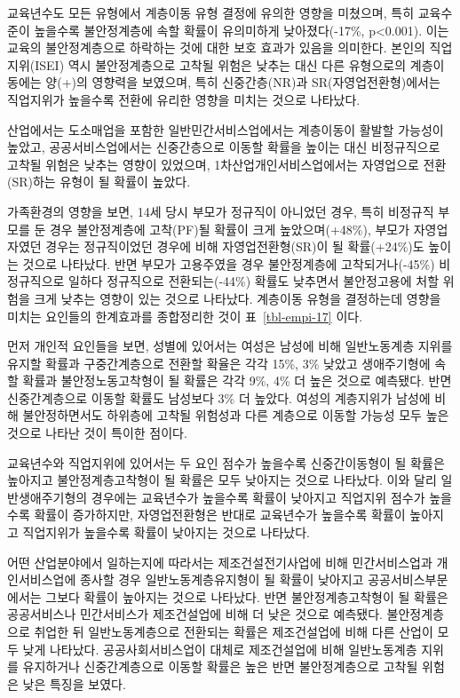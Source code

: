 \documentclass[
  letterpaper,
  DIV=11,
  numbers=noendperiod]{scrartcl}
\begin{document}
교육년수도 모든 유형에서 계층이동 유형 결정에 유의한 영향을 미쳤으며,
특히 교육수준이 높을수록 불안정계층에 속할 확률이 유의미하게
낮아졌다(-17\%, p\textless0.001). 이는 교육의 불안정계층으로 하락하는
것에 대한 보호 효과가 있음을 의미한다. 본인의 직업지위(ISEI) 역시
불안정계층으로 고착될 위험은 낮추는 대신 다른 유형으로의 계층이동에는
양(+)의 영향력을 보였으며, 특히 신중간층(NR)과 SR(자영업전환형)에서는
직업지위가 높을수록 전환에 유리한 영향을 미치는 것으로 나타났다.

산업에서는 도소매업을 포함한 일반민간서비스업에서는 계층이동이 활발할
가능성이 높았고, 공공서비스업에서는 신중간층으로 이동할 확률을 높이는
대신 비정규직으로 고착될 위험은 낮추는 영향이 있었으며,
1차산업개인서비스업에서는 자영업으로 전환(SR)하는 유형이 될 확률이
높았다.

가족환경의 영향을 보면, 14세 당시 부모가 정규직이 아니었던 경우, 특히
비정규직 부모를 둔 경우 불안정계층에 고착(PF)될 확률이 크게
높았으며(+48\%), 부모가 자영업자였던 경우는 정규직이었던 경우에 비해
자영업전환형(SR)이 될 확률(+24\%)도 높이는 것으로 나타났다. 반면 부모가
고용주였을 경우 불안정계층에 고착되거나(-45\%) 비정규직으로 일하다
정규직으로 전환되는(-44\%) 확률도 낮추면서 불안정고용에 처할 위험을 크게
낮추는 영향이 있는 것으로 나타났다. 계층이동 유형을 결정하는데 영향을
미치는 요인들의 한계효과를 종합정리한 것이 표~\ref{tbl-empi-17} 이다.

먼저 개인적 요인들을 보면, 성별에 있어서는 여성은 남성에 비해
일반노동계층 지위를 유지할 확률과 구중간계층으로 전환할 확율은 각각
15\%, 3\% 낮았고 생애주기형에 속할 확률과 불안정노동고착형이 될 확률은
각각 9\%, 4\% 더 높은 것으로 예측됐다. 반면 신중간계층으로 이동할 확률도
남성보다 3\% 더 높았다. 여성의 계층지위가 남성에 비해 불안정하면서도
하위층에 고착될 위험성과 다른 계층으로 이동할 가능성 모두 높은 것으로
나타난 것이 특이한 점이다.

교육년수와 직업지위에 있어서는 두 요인 점수가 높을수록 신중간이동형이 될
확률은 높아지고 불안정계층고착형이 될 확률은 모두 낮아지는 것으로
나타났다. 이와 달리 일반생애주기형의 경우에는 교육년수가 높을수록 확률이
낮아지고 직업지위 점수가 높을수록 확률이 증가하지만, 자영업전환형은
반대로 교육년수가 높을수록 확률이 높아지고 직업지위가 높을수록 확률이
낮아지는 것으로 나타났다.

어떤 산업분야에서 일하는지에 따라서는 제조건설전기사업에 비해
민간서비스업과 개인서비스업에 종사할 경우 일반노동계층유지형이 될 확률이
낮아지고 공공서비스부문에서는 그보다 확률이 높아지는 것으로 나타났다.
반면 불안정계층고착형이 될 확률은 공공서비스나 민간서비스가 제조건설업에
비해 더 낮은 것으로 예측됐다. 불안정계층으로 취업한 뒤 일반노동계층으로
전환되는 확률은 제조건설업에 비해 다른 산업이 모두 낮게 나타났다.
공공사회서비스업이 대체로 제조건설업에 비해 일반노동계층 지위를
유지하거나 신중간계층으로 이동할 확률은 높은 반면 불안정계층으로 고착될
위험은 낮은 특징을 보였다.
\end{document}
